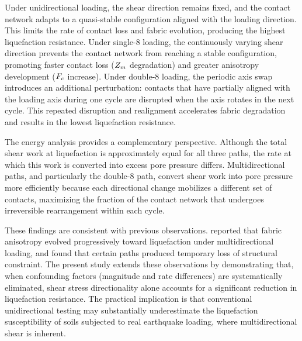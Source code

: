 Under unidirectional loading, the shear direction remains fixed, and the contact network adapts to a quasi-stable configuration aligned with the loading direction. This limits the rate of contact loss and fabric evolution, producing the highest liquefaction resistance. Under single-8 loading, the continuously varying shear direction prevents the contact network from reaching a stable configuration, promoting faster contact loss ($Z_m$ degradation) and greater anisotropy development ($F_c$ increase). Under double-8 loading, the periodic axis swap introduces an additional perturbation: contacts that have partially aligned with the loading axis during one cycle are disrupted when the axis rotates in the next cycle. This repeated disruption and realignment accelerates fabric degradation and results in the lowest liquefaction resistance.

The energy analysis provides a complementary perspective. Although the total shear work at liquefaction is approximately equal for all three paths, the rate at which this work is converted into excess pore pressure differs. Multidirectional paths, and particularly the double-8 path, convert shear work into pore pressure more efficiently because each directional change mobilizes a different set of contacts, maximizing the fraction of the contact network that undergoes irreversible rearrangement within each cycle.

These findings are consistent with previous observations. \citet{Wei2020} reported that fabric anisotropy evolved progressively toward liquefaction under multidirectional loading, and \citet{Yang2022} found that certain paths produced temporary loss of structural constraint. The present study extends these observations by demonstrating that, when confounding factors (magnitude and rate differences) are systematically eliminated, shear stress directionality alone accounts for a significant reduction in liquefaction resistance. The practical implication is that conventional unidirectional testing may substantially underestimate the liquefaction susceptibility of soils subjected to real earthquake loading, where multidirectional shear is inherent.
